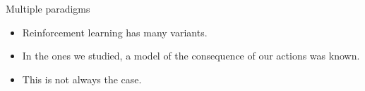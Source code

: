 \documentclass[usenames,dvipsnames]{beamer}
\newcounter{numexos}%
\newcommand{\exercice}[1]{%
\addtocounter{numexos}{1}%
\textcolor{DarkOrchid}{Exercice\,\thenumexos\,:}\,#1%
}
\begin{document}
%
%
%

\begin{frame}{Multiple paradigms}
   \begin{itemize}
       \item Reinforcement learning has many variants.
        \item In the ones we studied, a model of the consequence of our actions was
            known.
        \item This is not always the case.
   \end{itemize} 
\end{frame}
\end{document}
